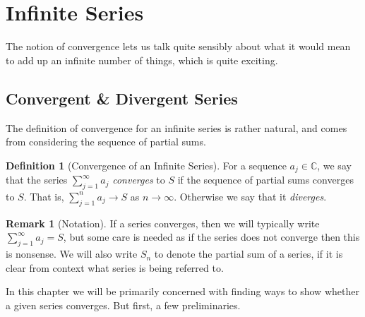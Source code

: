 \documentclass[11pt, a4paper]{article}
\theoremstyle{definition}
\newtheorem{definition}[theorem]{Definition}
\newtheorem*{remark}{Remark}
\newenvironment{aside}[1]{
	\noindent
    \rule{\textwidth}{0.025cm}
    \vspace{-1.75\baselineskip}
    \subsection*{#1}}
{\noindent\rule{\textwidth}{0.025cm}}
\newcommand{\vocab}[1]{\emph{#1}} %
\newcommand{\C}{\mathbb{C}}
\begin{document}

	

\clearpage
\section{Infinite Series}\label{sec:2}

The notion of convergence lets us talk quite sensibly about what it would mean to add up an infinite number of things, which is quite exciting. 

\subsection{Convergent \& Divergent Series}

The definition of convergence for an infinite series is rather natural, and comes from considering the sequence of partial sums.


\begin{definition}[Convergence of an Infinite Series]
		For a sequence $a_j \in \C$, we say that the series $\sum_{j = 1}^{\infty} a_j$ \vocab{converges} to $S$ if the sequence of partial sums converges to $S$.
		That is, $\sum_{j = 1}^{n} a_j \rightarrow S$ as $n \rightarrow \infty$. Otherwise we say that it \vocab{diverges}.
	\end{definition}

	\begin{remark}[Notation]
		If a series converges, then we will typically write $\sum_{j = 1}^{\infty} a_j = S$, but some care is needed as if the series does not converge then this is nonsense. 
		We will also write $S_n$ to denote the partial sum of a series, if it is clear from context what series is being referred to.
	\end{remark}

In this chapter we will be primarily concerned with finding ways to show whether a given series converges. But first, a few preliminaries.
\end{document}
